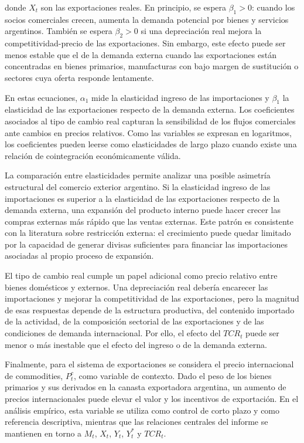 \documentclass[11pt,a4paper]{article}
\begin{document}
	donde $X_t$ son las exportaciones reales. En principio, se espera $\beta_1>0$:
	cuando los socios comerciales crecen, aumenta la demanda potencial por bienes y
	servicios argentinos. También se espera $\beta_2>0$ si una depreciación real
	mejora la competitividad-precio de las exportaciones. Sin embargo, este efecto
	puede ser menos estable que el de la demanda externa cuando las exportaciones
	están concentradas en bienes primarios, manufacturas con bajo margen de
	sustitución o sectores cuya oferta responde lentamente.

	En estas ecuaciones, $\alpha_1$ mide la elasticidad ingreso de las
	importaciones y $\beta_1$ la elasticidad de las exportaciones respecto de la
	demanda externa. Los coeficientes asociados al tipo de cambio real capturan la
	sensibilidad de los flujos comerciales ante cambios en precios relativos. Como
	las variables se expresan en logaritmos, los coeficientes pueden leerse como
	elasticidades de largo plazo cuando existe una relación de cointegración
	económicamente válida.

	La comparación entre elasticidades permite analizar una posible asimetría
	estructural del comercio exterior argentino. Si la elasticidad ingreso de las
	importaciones es superior a la elasticidad de las exportaciones respecto de la
	demanda externa, una expansión del producto interno puede hacer crecer las
	compras externas más rápido que las ventas externas. Este patrón es consistente
	con la literatura sobre restricción externa: el crecimiento puede quedar
	limitado por la capacidad de generar divisas suficientes para financiar las
	importaciones asociadas al propio proceso de expansión.
	
	El tipo de cambio real cumple un papel adicional como precio relativo entre
	bienes domésticos y externos. Una depreciación real debería encarecer las
	importaciones y mejorar la competitividad de las exportaciones, pero la magnitud
	de esas respuestas depende de la estructura productiva, del contenido importado
	de la actividad, de la composición sectorial de las exportaciones y de las
	condiciones de demanda internacional. Por ello, el efecto del $TCR_t$ puede ser
	menor o más inestable que el efecto del ingreso o de la demanda externa.

	Finalmente, para el sistema de exportaciones se considera el precio
	internacional de commodities, $P_t^c$, como variable de contexto. Dado el peso
	de los bienes primarios y sus derivados en la canasta exportadora argentina, un
	aumento de precios internacionales puede elevar el valor y los incentivos de
	exportación. En el análisis empírico, esta variable se utiliza como control de
	corto plazo y como referencia descriptiva, mientras que las relaciones centrales
	del informe se mantienen en torno a \(M_t\), \(X_t\), \(Y_t\), \(Y_t^*\) y
	\(TCR_t\).
	
\end{document}
